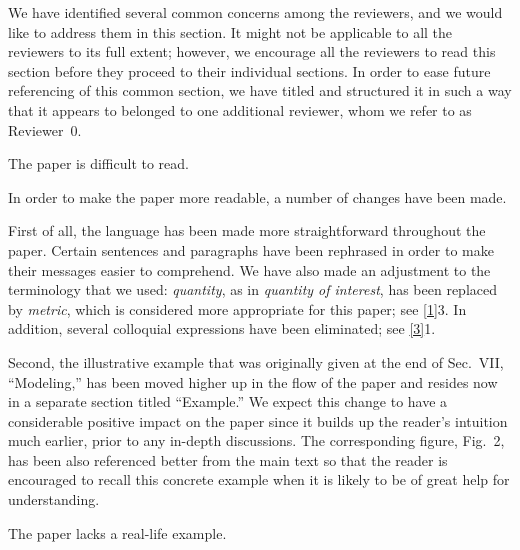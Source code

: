 We have identified several common concerns among the reviewers, and we would
like to address them in this section. It might not be applicable to all the
reviewers to its full extent; however, we encourage all the reviewers to read
this section before they proceed to their individual sections. In order to ease
future referencing of this common section, we have titled and structured it in
such a way that it appears to belonged to one additional reviewer, whom we refer
to as Reviewer~0.

\vspace{2em}

\begin{reviewer}
 The paper is difficult to read.
\end{reviewer}

\begin{authors}
In order to make the paper more readable, a number of changes have been made.

First of all, the language has been made more straightforward throughout the
paper. Certain sentences and paragraphs have been rephrased in order to make
their messages easier to comprehend. We have also made an adjustment to the
terminology that we used: \emph{quantity}, as in \emph{quantity of interest},
has been replaced by \emph{metric}, which is considered more appropriate for
this paper; see \cref{1}{3}. In addition, several colloquial expressions have
been eliminated; see \cref{3}{1}.

Second, the illustrative example that was originally given at the end of
Sec.~VII, ``Modeling,'' has been moved higher up in the flow of the paper and
resides now in a separate section titled ``Example.'' We expect this change to
have a considerable positive impact on the paper since it builds up the reader's
intuition much earlier, prior to any in-depth discussions. The corresponding
figure, Fig.~2, has been also referenced better from the main text so that the
reader is encouraged to recall this concrete example when it is likely to be of
great help for understanding.

\begin{actions}
\end{actions}
\end{authors}

\begin{reviewer}
 The paper lacks a real-life example.
\end{reviewer}

